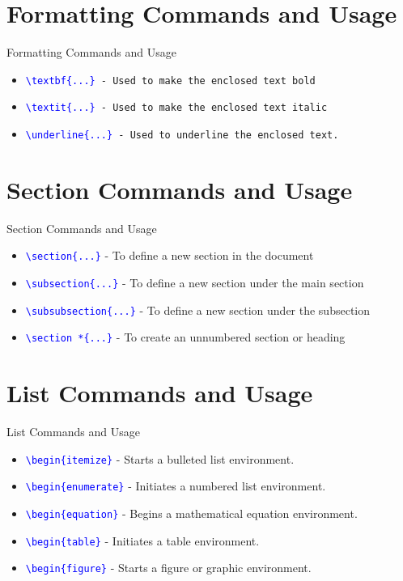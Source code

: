 \documentclass{beamer}
\begin{document}
	\section{Formatting Commands and Usage}
	\begin{frame}{ Formatting Commands and Usage}
		\begin{itemize}
			\item \texttt{\textcolor{blue}{\textbackslash textbf\{...\}} - Used to make the enclosed text bold}
			\item \texttt{\textcolor{blue}{\textbackslash textit\{...\}} - Used to make the enclosed text italic}
			\item \texttt{\textcolor{blue}{\textbackslash underline\{...\}} -  Used to underline the enclosed text.}
		\end{itemize}
	\end{frame}

	\section{Section Commands and Usage}
	\begin{frame}{Section Commands and Usage}
		\begin{itemize}
			\item \texttt{\textcolor{blue}{\textbackslash section\{...\}}} - To define a new section in the document
			\item \texttt{\textcolor{blue}{\textbackslash subsection\{...\}}} - To define a new section under the main section
			\item \texttt{\textcolor{blue}{\textbackslash subsubsection\{...\}}} - To define a new section under the subsection
			\item \texttt{\textcolor{blue}{\textbackslash section *\{...\}}} - To create an unnumbered section or heading
		\end{itemize}
		
	\end{frame}

	\section{List Commands and Usage}
	\begin{frame}{List Commands and Usage}
		\begin{itemize}
			\item \texttt{\textcolor{blue}{\textbackslash begin\{itemize\}}} - Starts a bulleted list environment.
			\item \texttt{\textcolor{blue}{\textbackslash begin\{enumerate\}}} - Initiates a numbered list environment.
			\item \texttt{\textcolor{blue}{\textbackslash begin\{equation\}}} - Begins a mathematical equation environment.
			\item \texttt{\textcolor{blue}{\textbackslash begin\{table\}}} - Initiates a table environment.
			\item \texttt{\textcolor{blue}{\textbackslash begin\{figure\}}} - Starts a figure or graphic environment.
		\end{itemize}
		
	\end{frame}
\end{document}
